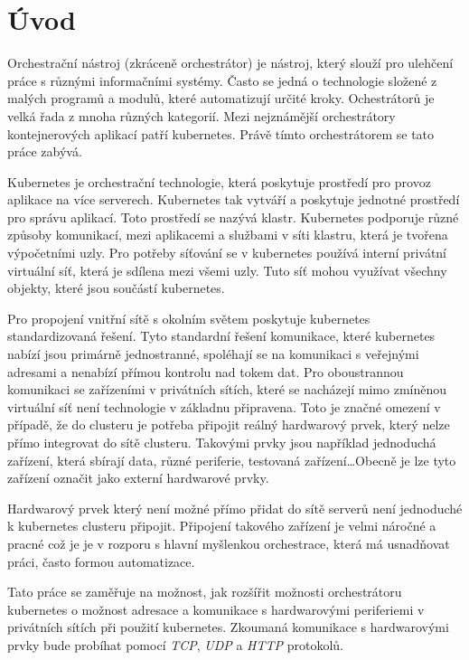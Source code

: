 \chapter*{Úvod}
\setcounter{page}{1}

Orchestrační nástroj (zkráceně orchestrátor) je nástroj, který slouží pro ulehčení práce s různými informačními systémy. Často se jedná o technologie složené z malých programů a modulů, které automatizují určité kroky. Ochestrátorů je velká řada z mnoha různých kategorií. Mezi nejznámější orchestrátory kontejnerových aplikací patří kubernetes. Právě tímto orchestrátorem se tato práce zabývá. \cite{goldberg_2019_workflow}

Kubernetes je orchestrační technologie, která poskytuje prostředí pro provoz aplikace na více serverech. Kubernetes tak vytváří a poskytuje jednotné prostředí pro správu aplikací. Toto prostředí se nazývá klastr. Kubernetes podporuje různé způsoby komunikací, mezi aplikacemi a službami v síti klastru, která je tvořena výpočetními uzly. Pro potřeby síťování se v kubernetes používá interní privátní virtuální síť, která je sdílena mezi všemi uzly. Tuto síť mohou využívat všechny objekty, které jsou součástí kubernetes.

Pro propojení vnitřní sítě s okolním světem poskytuje kubernetes standardizovaná řešení. Tyto standardní řešení komunikace, které kubernetes nabízí jsou primárně jednostranné, spoléhají se na komunikaci s veřejnými adresami a nenabízí přímou kontrolu nad tokem dat. Pro oboustrannou komunikaci se zařízeními v privátních sítích, které se nacházejí mimo zmíněnou virtuální síť není technologie v základnu připravena. Toto je značné omezení v případě, že do clusteru je potřeba připojit reálný hardwarový prvek, který nelze přímo integrovat do sítě clusteru. Takovými prvky jsou například jednoduchá zařízení, která sbírají data, různé periferie, testovaná zařízení\ldots Obecně je lze tyto zařízení označit jako externí hardwarové prvky.

Hardwarový prvek který není možné přímo přidat do sítě serverů není jednoduché k kubernetes clusteru připojit. Připojení takového zařízení je velmi náročné a pracné což je je v rozporu s hlavní myšlenkou orchestrace, která má usnadňovat práci, často formou automatizace.

Tato práce se zaměřuje na možnost, jak rozšířit možnosti orchestrátoru kubernetes o možnost adresace a komunikace s hardwarovými periferiemi v privátních sítích při použití kubernetes. Zkoumaná komunikace s hardwarovými prvky bude probíhat pomocí \textit{TCP}, \textit{UDP} a \textit{HTTP} protokolů.

